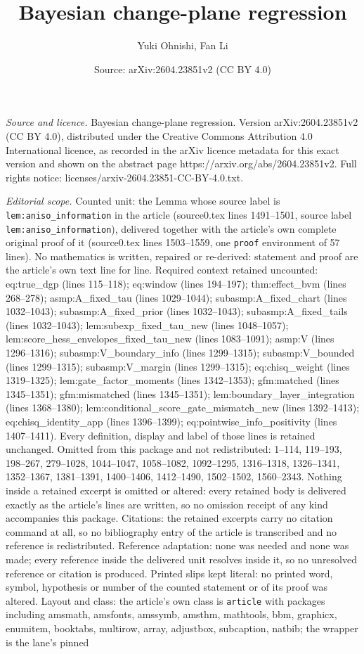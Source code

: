 \documentclass[10pt,a4paper]{amsart}
\title[Bayesian change-plane regression]{Bayesian change-plane regression}
\author{Yuki Ohnishi, Fan Li}
\date{Source: arXiv:2604.23851v2 (CC BY 4.0)}
\begin{document}
\maketitle

\noindent\emph{Source and licence.} Bayesian change-plane regression. Version arXiv:2604.23851v2 (CC BY 4.0), distributed under the Creative Commons Attribution 4.0 International licence, as recorded in the arXiv licence metadata for this exact version and shown on the abstract page https://arxiv.org/abs/2604.23851v2. Full rights notice: licenses/arxiv-2604.23851-CC-BY-4.0.txt.\par\smallskip

\noindent\textit{Editorial scope.} Counted unit: the Lemma whose source label is \texttt{lem:aniso\_information} in the article (source0.tex lines 1491--1501, source label \texttt{lem:aniso\_information}), delivered together with the article's own complete original proof of it (source0.tex lines 1503--1559, one \texttt{proof} environment of 57 lines). No mathematics is written, repaired or re-derived: statement and proof are the article's own text line for line. Required context retained uncounted: eq:true\_dgp (lines 115--118); eq:window (lines 194--197); thm:effect\_bvm (lines 268--278); asmp:A\_fixed\_tau (lines 1029--1044); subasmp:A\_fixed\_chart (lines 1032--1043); subasmp:A\_fixed\_prior (lines 1032--1043); subasmp:A\_fixed\_tails (lines 1032--1043); lem:subexp\_fixed\_tau\_new (lines 1048--1057); lem:score\_hess\_envelopes\_fixed\_tau\_new (lines 1083--1091); asmp:V (lines 1296--1316); subasmp:V\_boundary\_info (lines 1299--1315); subasmp:V\_bounded (lines 1299--1315); subasmp:V\_margin (lines 1299--1315); eq:chisq\_weight (lines 1319--1325); lem:gate\_factor\_moments (lines 1342--1353); gfm:matched (lines 1345--1351); gfm:mismatched (lines 1345--1351); lem:boundary\_layer\_integration (lines 1368--1380); lem:conditional\_score\_gate\_mismatch\_new (lines 1392--1413); eq:chisq\_identity\_app (lines 1396--1399); eq:pointwise\_info\_positivity (lines 1407--1411). Every definition, display and label of those lines is retained unchanged. Omitted from this package and not redistributed: 1--114, 119--193, 198--267, 279--1028, 1044--1047, 1058--1082, 1092--1295, 1316--1318, 1326--1341, 1352--1367, 1381--1391, 1400--1406, 1412--1490, 1502--1502, 1560--2343. Nothing inside a retained excerpt is omitted or altered: every retained body is delivered exactly as the article's lines are written, so no omission receipt of any kind accompanies this package. Citations: the retained excerpts carry no citation command at all, so no bibliography entry of the article is transcribed and no reference is redistributed. Reference adaptation: none was needed and none was made; every reference inside the delivered unit resolves inside it, so no unresolved reference or citation is produced. Printed slips kept literal: no printed word, symbol, hypothesis or number of the counted statement or of its proof was altered. Layout and class: the article's own class is \texttt{article} with packages including amsmath, amsfonts, amssymb, amsthm, mathtools, bbm, graphicx, enumitem, booktabs, multirow, array, adjustbox, subcaption, natbib; the wrapper is the lane's pinned 
\end{document}
